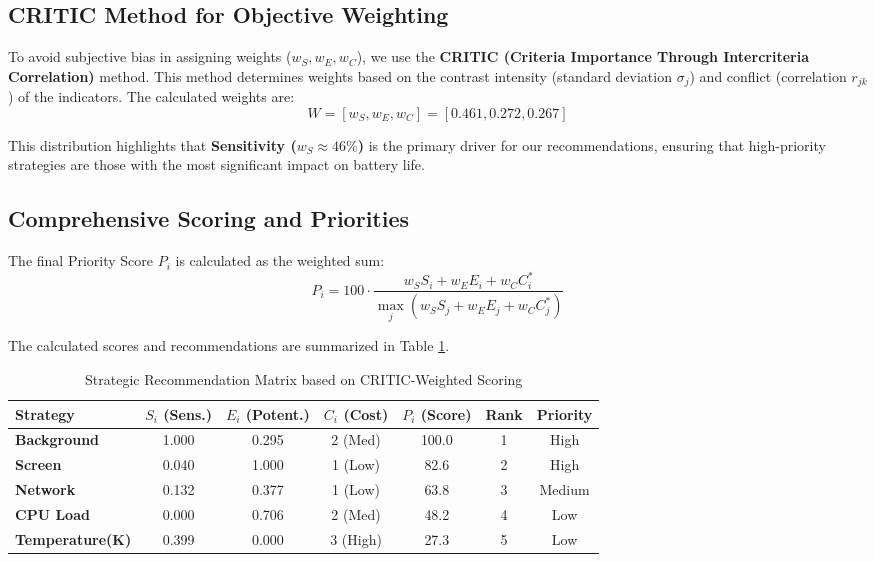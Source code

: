 \documentclass{mcmthesis}
\begin{document}
\subsection{CRITIC Method for Objective Weighting}
To avoid subjective bias in assigning weights ($w_S, w_E, w_C$), we use the \textbf{CRITIC (Criteria Importance Through Intercriteria Correlation)} method. This method determines weights based on the contrast intensity (standard deviation $\sigma_j$) and conflict (correlation $r_{jk}$) of the indicators. The calculated weights are:
$$W = [w_S, w_E, w_C] = [0.461, 0.272, 0.267]$$

This distribution highlights that \textbf{Sensitivity ($w_S \approx 46\%$)} is the primary driver for our recommendations, ensuring that high-priority strategies are those with the most significant impact on battery life.

\subsection{Comprehensive Scoring and Priorities}
The final Priority Score $P_i$ is calculated as the weighted sum:
\begin{equation}
P_i = 100 \cdot \frac{w_S S_i + w_E E_i + w_C C_i^*}{\max_j (w_S S_j + w_E E_j + w_C C_j^*)}
\end{equation}

The calculated scores and recommendations are summarized in Table \ref{tab:recommendations}.

\begin{table}[H]
\centering
\caption{Strategic Recommendation Matrix based on CRITIC-Weighted Scoring}
\label{tab:recommendations}
\begin{tabular}{lcccccc}
\toprule
\textbf{Strategy} & \textbf{$S_i$ (Sens.)} & \textbf{$E_i$ (Potent.)} & \textbf{$C_i$ (Cost)} & \textbf{$P_i$ (Score)} & \textbf{Rank} & \textbf{Priority} \\
\midrule
\textbf{Background} & 1.000 & 0.295 & 2 (Med) & 100.0 & 1 & High \\
\textbf{Screen} & 0.040 & 1.000 & 1 (Low) & 82.6 & 2 & High \\
\textbf{Network} & 0.132 & 0.377 & 1 (Low) & 63.8 & 3 & Medium \\
\textbf{CPU Load} & 0.000 & 0.706 & 2 (Med) & 48.2 & 4 & Low \\
\textbf{Temperature(K)} & 0.399 & 0.000 & 3 (High) & 27.3 & 5 & Low \\
\bottomrule
\end{tabular}
\end{table}
\end{document}

